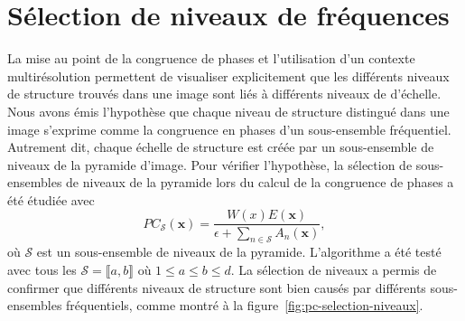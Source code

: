 \section{Sélection de niveaux de fréquences}

La mise au point de la congruence de phases et l'utilisation d'un contexte multirésolution permettent de visualiser explicitement que les différents niveaux de structure trouvés dans une image sont liés à différents niveaux de d'échelle. Nous avons émis l'hypothèse que chaque niveau de structure distingué dans une image s'exprime comme la congruence en phases d'un sous-ensemble fréquentiel. Autrement dit, chaque échelle de structure est créée par un sous-ensemble de niveaux de la pyramide d'image. Pour vérifier l'hypothèse, la sélection de sous-ensembles de niveaux de la pyramide lors du calcul de la congruence de phases a été étudiée avec
\begin{equation}
    PC_{\mathcal{S}}(\mathbf{x}) = \frac{W(x)E(\mathbf{x})}{\epsilon + \sum_{n\in\mathcal{S}} A_{n}(\mathbf{x})},
\end{equation}
où $\mathcal{S}$ est un sous-ensemble de niveaux de la pyramide. L'algorithme a été testé avec tous les $\mathcal{S} = \llbracket a, b\rrbracket$ où $1 \leq a \leq b \leq d$. La sélection de niveaux a permis de confirmer que différents niveaux de structure sont bien causés par différents sous-ensembles fréquentiels, comme montré à la figure~\ref{fig:pc-selection-niveaux}.

\bigskip

